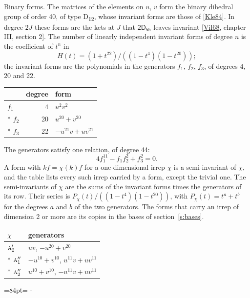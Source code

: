 \documentclass[10pt,a4paper]{article}
\makeatletter
\renewcommand\paragraph{\@startsection{paragraph}{4}{\z@}{1.5ex plus .5ex minus .2ex}{-1em}%
  {\normalfont\small\sffamily\bfseries\color{parttitle}}}
\newcommand{\needspace}[1]{\par\penalty-100\begingroup\dimen0=#1\relax\dimen2=\pagegoal
  \advance\dimen2-\pagetotal\ifdim\dimen0>\dimen2\relax\ifdim\dimen2>0pt\vfil\break\fi\fi
  \endgroup}
\numberwithin{equation}{section}
\newcommand{\grp}[1]{\mathsf{#1}}
\newcommand{\irr}[1]{\text{\normalfont\scshape #1}}
\makeatother
\begin{document}
\paragraph{Binary forms.}
The matrices of the elements on $u$, $v$ form the binary dihedral group of order 40, of type D\textsubscript{12}, whose invariant forms are those of [\href{../../../REFERENCES.pdf\#ref.Kle84}{Kle84}]. In degree $2J$ these forms are the kets at $J$ that $\grp{2D_{5h}}$ leaves invariant [\href{../../../REFERENCES.pdf\#ref.Vil68}{Vil68}, chapter III, section 2]. \label{n:head.degree}\label{n:head.form}The number of linearly independent invariant forms of degree $n$ is the coefficient of $t^n$ in
\begin{equation}\label{e:molien}H(t) = (1 + t^{22})/((1-t^{4})(1-t^{20}));\end{equation}
the invariant forms are the polynomials in the generators $f_1$, $f_2$, $f_3$, of degrees 4, 20 and 22.
{\small\begin{longtable}{@{}lrl@{}}\toprule
& degree & form\\\midrule\endhead
\bottomrule\endfoot\endlastfoot
$f_{1}$ & 4 & $u^{2}v^{2}$\\*
$f_{2}$ & 20 & $u^{20} + v^{20}$\\*
$f_{3}$ & 22 & $-u^{21}v + uv^{21}$\\
\bottomrule\end{longtable}}
The generators satisfy one relation, of degree 44:
\begin{equation}\label{e:relation}4f_{1}^{11} - f_{1}f_{2}^{2} + f_{3}^{2} = 0.\end{equation}
A form with $k f = \chi(k) f$ for a one-dimensional irrep $\chi$ is a semi-invariant of $\chi$, and the table lists every such irrep carried by a form, except the trivial one. \label{n:head.generators}The semi-invariants of $\chi$ are the sums of the invariant forms times the generators of its row. Their series is $P_\chi(t)/((1-t^{4})(1-t^{20}))$, with $P_\chi(t) = t^{a} + t^{b}$ for the degrees $a$ and $b$ of the two generators. The forms that carry an irrep of dimension 2 or more are its copies in the bases of section~\ref{s:bases}.
{\small\begin{longtable}{@{}ll@{}}\toprule
$\chi$ & generators\\\midrule\endhead
\bottomrule\endfoot\endlastfoot
$\irr{a}_{2}'$ & $uv$, $-u^{20} + v^{20}$\\*
$\irr{a}_{1}''$ & $-u^{10} + v^{10}$, $u^{11}v + uv^{11}$\\*
$\irr{a}_{2}''$ & $u^{10} + v^{10}$, $-u^{11}v + uv^{11}$\\
\bottomrule\end{longtable}}
\needspace{84pt}
\end{document}
